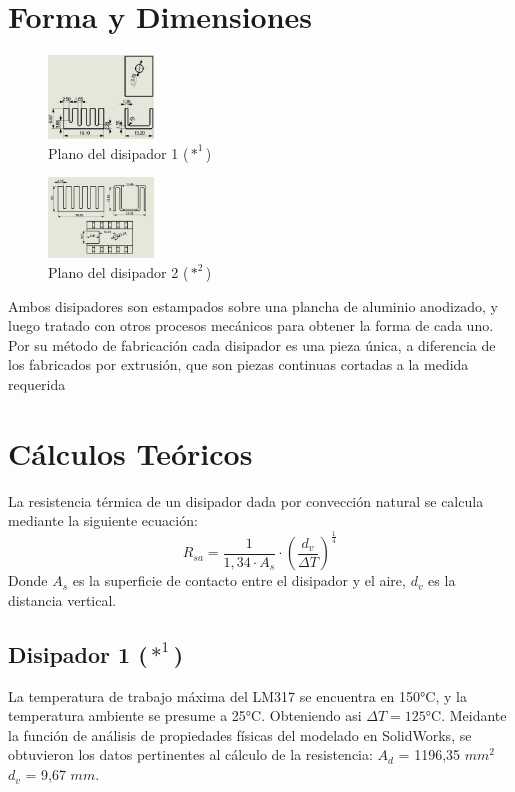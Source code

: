 \documentclass[conference]{IEEEtran}
\begin{document}
\section{Forma y Dimensiones}
\begin{figure}[H]
    \centering
    \includegraphics[width=0.25\textwidth]{disipadorFacu.png}
    \caption{Plano del disipador 1 ($*^1$)}
\end{figure}
\begin{figure}[H]
    \centering
    \includegraphics[width=0.25\textwidth]{PlanoRamiCompleto.png}
    \caption{Plano del disipador 2 ($*^2$)}
\end{figure}
Ambos disipadores son estampados sobre una plancha de aluminio anodizado, y luego tratado con otros 
procesos mecánicos para obtener la forma de cada uno. Por su método de fabricación cada disipador
es una pieza única, a diferencia de los fabricados por extrusión, que son piezas continuas cortadas 
a la medida requerida

\section{Cálculos Teóricos}
La resistencia térmica de un disipador dada por convección natural se calcula mediante la siguiente
ecuación:
\begin{equation}
    R_{sa} = \frac{1}{1,34\cdot A_s}\cdot (\frac{d_v}{\Delta T})^{\frac{1}{4}}
\end{equation}
Donde $A_s$ es la superficie de contacto entre el disipador y el aire, $d_v$ es la distancia vertical.

\subsection{Disipador 1 ($*^1$)}
La temperatura de trabajo máxima del LM317 se encuentra en 150°C, y la temperatura ambiente
se presume a 25°C. Obteniendo asi $\Delta T = 125$°C.
Meidante la función de análisis de propiedades físicas del modelado en SolidWorks, se obtuvieron
los datos pertinentes al cálculo de la resistencia:
$A_d$ = 1196,35 $mm^2$
$d_v$ = 9,67 $mm$.
\end{document}
